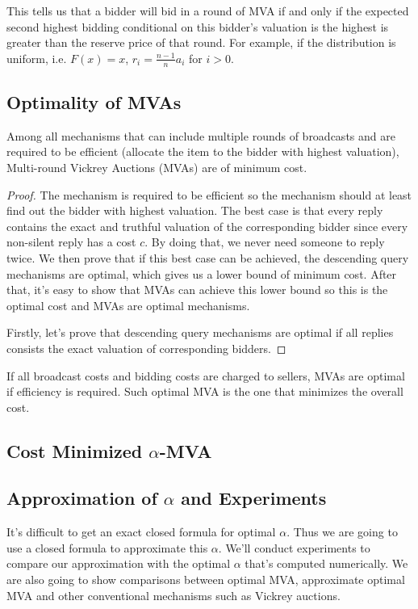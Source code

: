 This tells us that a bidder will bid in a round of MVA if and only if the
expected second highest bidding conditional on this bidder's valuation is the
highest is greater than the reserve price of that round. For example, if the
distribution is uniform, i.e. $F(x) = x$, $r_i = \frac{n-1}{n} a_i$ for
$i > 0$.

\subsection{Optimality of MVAs}

\begin{theorem}\label{theorem1}

Among all mechanisms that can include multiple rounds of broadcasts and are
required to be efficient (allocate the item to the bidder with highest
valuation), Multi-round Vickrey Auctions (MVAs) are of minimum cost.

\end{theorem}

\begin{proof}

The mechanism is required to be efficient so the mechanism should at least find
out the bidder with highest valuation. The best case is that every reply
contains the exact and truthful valuation of the corresponding bidder since
every non-silent reply has a cost $c$. By doing that, we never need someone to
reply twice. We then prove that if this best case can be achieved, the
descending query mechanisms are optimal, which gives us a lower bound of
minimum cost. After that, it's easy to show that MVAs can achieve this lower
bound so this is the optimal cost and MVAs are optimal mechanisms.

Firstly, let's prove that descending query mechanisms are optimal if all replies
consists the exact valuation of corresponding bidders.

\end{proof}


\begin{corollary}

If all broadcast costs and bidding costs are charged to sellers, MVAs are
optimal if efficiency is required.  Such optimal MVA is the one that minimizes
the overall cost.

\end{corollary}

\subsection{Cost Minimized $\alpha$-MVA}

\subsection{Approximation of $\alpha$ and Experiments}

It's difficult to get an exact closed formula for optimal $\alpha$. Thus we are
going to use a closed formula to approximate this $\alpha$. We'll conduct
experiments to compare our approximation with the optimal $\alpha$ that's
computed numerically. We are also going to show comparisons between optimal
MVA, approximate optimal MVA and other conventional mechanisms such as Vickrey
auctions.


